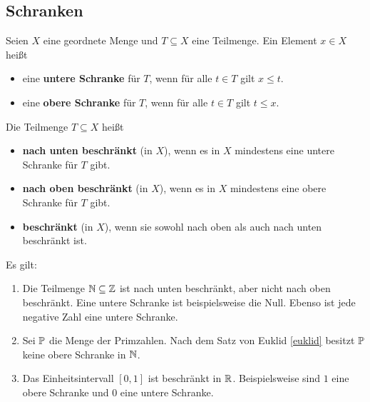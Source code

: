 \subsection*{Schranken}


\begin{defin}[Schranken] \label{def:schranken}  
    Seien $X$ eine geordnete Menge und $T\subseteq X$ eine Teilmenge. Ein Element $x\in X$ heißt
    \begin{itemize}
        \item eine \textbf{untere Schranke} für $T$, wenn für alle $t\in T$ gilt $x\le t$.
        \item eine \textbf{obere Schranke} für $T$, wenn für alle $t\in T$ gilt $t\le x$.
    \end{itemize}
    Die Teilmenge $T\subseteq X$ heißt
    \begin{itemize}
        \item \textbf{nach unten beschränkt} (in $X$), wenn es in $X$ mindestens eine untere Schranke für $T$ gibt.
        \item \textbf{nach oben beschränkt} (in $X$), wenn es in $X$ mindestens eine obere Schranke für $T$ gibt.
        \item \textbf{beschränkt} (in $X$), wenn sie sowohl nach oben als auch nach unten beschränkt ist.
    \end{itemize}
\end{defin}


\begin{bsp}
    Es gilt:
    \begin{enumerate}
        \item Die Teilmenge $\mathbb N\subseteq \mathbb Z$ ist nach unten beschränkt, aber nicht nach oben beschränkt. Eine untere Schranke ist beispielsweise die Null. Ebenso ist jede negative Zahl eine untere Schranke.
        \item Sei $\mathbb P$ die Menge der Primzahlen. Nach dem Satz von Euklid \cref{euklid} besitzt $\mathbb P$ keine obere Schranke in $\mathbb N$.
        \item Das Einheitsintervall $[0,1]$ ist beschränkt in $\mathbb R$. Beispielsweise sind $1$ eine obere Schranke und $0$ eine untere Schranke.
    \end{enumerate}
\end{bsp}


